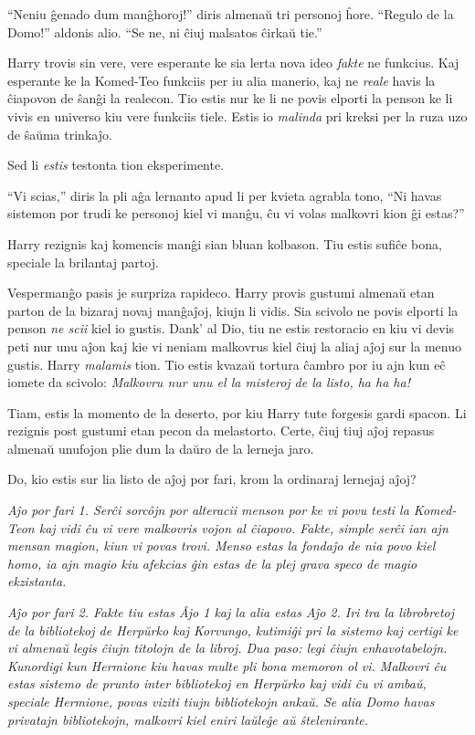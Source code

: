 ``Neniu ĝenado dum manĝhoroj!'' diris almenaŭ tri personoj
ĥore. ``Regulo de la Domo!'' aldonis alio. ``Se ne, ni ĉiuj malsatos
ĉirkaŭ tie.''

Harry trovis sin vere, vere esperante ke sia lerta nova ideo
\emph{fakte} ne funkcius. Kaj esperante ke la Komed-Teo funkciis per
iu alia manerio, kaj ne \emph{reale} havis la ĉiapovon de ŝanĝi la
realecon. Tio estis nur ke li ne povis elporti la penson ke li vivis
en universo kiu vere funkciis tiele. Estis io \emph{malinda} pri
kreksi per la ruza uzo de ŝaŭma trinkaĵo.

Sed li \emph{estis} testonta tion eksperimente.

``Vi scias,'' diris la pli aĝa lernanto apud li per kvieta agrabla
tono, ``Ni havas sistemon por trudi ke personoj kiel vi manĝu, ĉu vi
volas malkovri kion ĝi estas?''

Harry rezignis kaj komencis manĝi sian bluan kolbason. Tiu estis
sufiĉe bona, speciale la brilantaj partoj.

Vespermanĝo pasis je surpriza rapideco. Harry provis gustumi almenaŭ
etan parton de la bizaraj novaj manĝaĵoj, kiujn li vidis. Sia scivolo
ne povis elporti la penson \emph{ne scii} kiel io gustis. Dank' al
Dio, tiu ne estis restoracio en kiu vi devis peti nur unu aĵon kaj kie
vi neniam malkovrus kiel ĉiuj la aliaj aĵoj sur la menuo gustis. Harry
\emph{malamis} tion. Tio estis kvazaŭ tortura ĉambro por iu ajn kun
eĉ iomete da scivolo: \emph{Malkovru nur unu el la misteroj de la listo,
  ha ha ha!}

Tiam, estis la momento de la deserto, por kiu Harry tute forgesis
gardi spacon. Li rezignis post gustumi etan pecon da
melastorto. Certe, ĉiuj tiuj aĵoj repasus almenaŭ unufojon plie dum la
daŭro de la lerneja jaro.

Do, kio estis sur lia listo de aĵoj por fari, krom la ordinaraj
lernejaj aĵoj?

\emph{Aĵo por fari 1. Serĉi sorcôjn por alteracii menson por ke vi
  povu testi la Komed-Teon kaj vidi ĉu vi vere malkovris vojon al
  ĉiapovo. Fakte, simple serĉi ian ajn mensan magion, kiun vi povas
  trovi. Menso estas la fondaĵo de nia povo kiel homo, ia ajn magio
  kiu afekcias ĝin estas de la plej grava speco de magio ekzistanta.}

\emph{Aĵo por fari 2. Fakte tiu estas Âjo 1 kaj la alia estas Aĵo
  2. Iri tra la librobretoj de la bibliotekoj de Herpŭrko kaj
  Korvungo, kutimiĝi pri la sistemo kaj certigi ke vi almenaŭ legis
  ĉiujn titolojn de la libroj. Dua paso: legi ĉiujn
  enhavotabelojn. Kunordigi kun Hermione kiu havas multe pli bona
  memoron ol vi. Malkovri ĉu estas sistemo de prunto inter bibliotekoj
  en Herpŭrko kaj vidi ĉu vi ambaŭ, speciale Hermione, povas viziti
  tiujn bibliotekojn ankaŭ. Se alia Domo havas privatajn bibliotekojn,
  malkovri kiel eniri laŭleĝe aŭ ŝtelenirante.}

